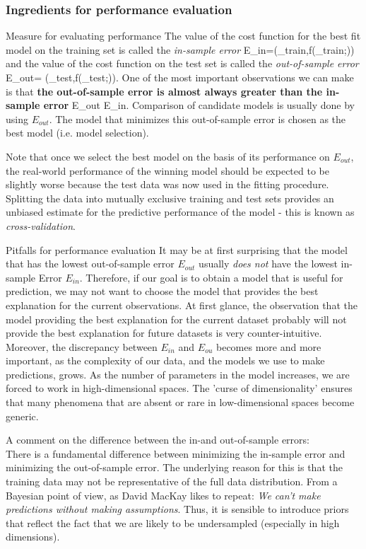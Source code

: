\subsubsection{Ingredients for performance evaluation}
\begin{mybox}{Measure for evaluating performance}
	The value of the cost function for the best fit model on the training set is called the \emph{in-sample error}
	\be 
	\label{eq:errorInsample}
	E_{in}=\mC(\my_{train},f(\mX_{train};\mt))
	\ee 
	and the value of the cost function on the test set is called the \emph{out-of-sample error}
	\be 
	\label{eq:errorOutsample}
	E_{out}= \mC(\my_{test},f(\mX_{test};\mt)).
	\ee 
	One of the most important observations we can make is that \textbf{the out-of-sample error is almost always greater than the in-sample error}
	\be 
	\label{eq:errorComparison}
	E_{out} \geq E_{in}.
	\ee 
	Comparison of candidate models is usually done by using $E_{out}$. The model that minimizes this out-of-sample error is chosen as the best model (i.e. model selection).
\end{mybox}
Note that once we select the best model on the basis of its performance on $E_{out}$, the real-world performance of the winning model should be expected to be slightly worse because the test data was now used in the fitting procedure.\\
Splitting the data into mutually exclusive training and test sets provides an unbiased estimate for the predictive performance of the model - this is known as \emph{cross-validation}.
\begin{mybox}{Pitfalls for performance evaluation}
	It may be at first surprising that the model that has the lowest out-of-sample error $E_{out}$ usually \emph{does not} have the lowest in-sample Error $E_{in}$. Therefore, if our goal is to obtain a model that is useful for prediction, we may not want to choose the model that provides the best explanation for the current observations. At first glance, the observation that the model providing the best explanation for the current dataset probably will not provide the best explanation for future datasets is very counter-intuitive. \\
Moreover, the discrepancy between $E_{in}$ and $E_{ou}$ becomes more and more important, as the complexity of our data, and the models we use to make predictions, grows. As the number of parameters in the model increases, we are forced to work in high-dimensional spaces. The ’curse of dimensionality’ ensures that many phenomena that are absent or rare in low-dimensional spaces become generic.
\end{mybox}
A comment on the difference between the in-and out-of-sample errors:\\
There is a fundamental difference between minimizing the in-sample error and minimizing the out-of-sample error. The underlying reason for this is that the training data may not be representative of the full data distribution. From a Bayesian point of view, as David MacKay likes to repeat: \emph{We can't make predictions without making assumptions}. Thus, it is sensible to introduce priors that reflect the fact that we are likely to be undersampled (especially in high dimensions).
